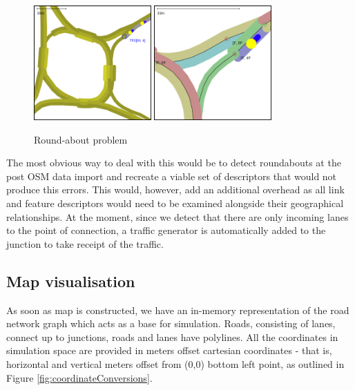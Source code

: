 \begin{figure}[!h]
	\vspace{1.5em}
  	\caption{Round-about problem}
  	\label{fig:roundAbout}
  	\centering
	\includegraphics[width=0.4\textwidth]{figs/graphConstruction/RoundAbout1.png}
	\hspace{0.2em}
	\includegraphics[width=0.40\textwidth]{figs/graphConstruction/RoundAbout2.png}
  	\vspace{1.5em}
\end{figure}

The most obvious way to deal with this would be to detect roundabouts at the post OSM data import and recreate a viable set of descriptors that would not produce this errors. This would, however, add an additional overhead as all link and feature descriptors would need to be examined alongside their geographical relationships. At the moment, since we detect that there are only incoming lanes to the point of connection, a traffic generator is automatically added to the junction to take receipt of the traffic.

\subsection{Map visualisation}
As soon as map is constructed, we have an in-memory representation of the road network graph which acts as a base for simulation. Roads, consisting of lanes, connect up to junctions, roads and lanes have polylines. All the coordinates in simulation space are provided in meters offset cartesian coordinates - that is, horizontal and vertical meters offset from (0,0) bottom left point, as outlined in Figure \ref{fig:coordinateConversions}.

